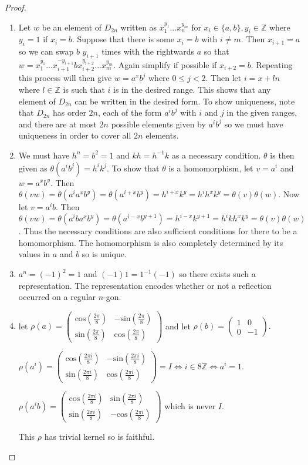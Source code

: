 \documentclass{article}
\begin{document}
\begin{proof}
\begin{enumerate}[label=(\roman*)]
    \item Let $w$ be an element of $D_{2n}$ written as $x_1^{y_1}...x_n^{y_m}$ for $x_i\in\{a,b\},y_i\in\mathbb{Z}$ where $y_i=1$ if $x_i=b$. Suppose that there is some $x_i=b$ with $i\neq m$. Then $x_{i+1}=a$ so we can swap $b$ $y_{i+1}$ times with the rightwards $a$ so that $w=x_1^{y_1}...x_{i+1}^{-y_{i+1}}bx_{i+2}^{y_{i+2}}...x_{m}^{y_m}$. Again simplify if possible if $x_{i+2}=b$. Repeating this process will then give $w=a^{x}b^j$ where $0\leq j<2$. Then let $i=x+ln$ where $l\in\mathbb{Z}$ is such that $i$ is in the desired range. This shows that any element of $D_{2n}$ can be written in the desired form. To show uniqueness, note that $D_{2n}$ has order $2n$, each of the form $a^ib^j$ with $i$ and $j$ in the given ranges, and there are at most $2n$ possible elements given by $a^ib^j$ so we must have uniqueness in order to cover all $2n$ elements. 
    \item We must have $h^n=b^2=1$ and $kh=h^{-1}k$ as a necessary condition. $\theta$ is then given as $\theta(a^ib^j)=h^ik^j$. To show that $\theta$ is a homomorphism, let $v=a^i$ and $w=a^xb^y$. Then $\theta(vw)=\theta(a^ia^xb^y)=\theta(a^{i+x}b^y)=h^{i+x}k^y=h^ih^xk^y=\theta(v)\theta(w)$. Now let $v=a^ib$. Then $\theta(vw)=\theta(a^iba^xb^y)=\theta(a^{i-x}b^{y+1})=h^{i-x}k^{y+1}=h^ikh^xk^y=\theta(v)\theta(w)$. Thus the necessary conditions are also sufficient conditions for there to be a homomorphism. The homomorphism is also completely determined by its values in $a$ and $b$ so is unique.
    \item $a^n=(-1)^2=1$ and $(-1)1=1^{-1}(-1)$ so there exists such a representation. The representation encodes whether or not a reflection occurred on a regular $n$-gon.
    \item let $\rho(a)=\begin{pmatrix}
  \text{cos}(\frac{2\pi}{8}) & -\text{sin}(\frac{2\pi}{8})\\ 
  \text{sin}(\frac{2\pi}{8}) & \text{cos}(\frac{2\pi}{8})
\end{pmatrix}$ and let $\rho(b)=\begin{pmatrix}
  1 & 0\\ 
  0 & -1
\end{pmatrix}.$

$\rho(a^i)=\begin{pmatrix}
  \text{cos}(\frac{2\pi i}{8}) & -\text{sin}(\frac{2\pi i}{8})\\ 
  \text{sin}(\frac{2\pi i}{8}) & \text{cos}(\frac{2\pi i}{8})
\end{pmatrix}=I\iff i\in 8\mathbb{Z}\iff a^i=1$.

$\rho(a^ib)=\begin{pmatrix}
  \text{cos}(\frac{2\pi i}{8}) & \text{sin}(\frac{2\pi i}{8})\\ 
  \text{sin}(\frac{2\pi i}{8}) & -\text{cos}(\frac{2\pi i}{8})
\end{pmatrix}$ which is never $I$.

This $\rho$ has trivial kernel so is faithful.
\end{enumerate}
\end{proof}
\end{document}
